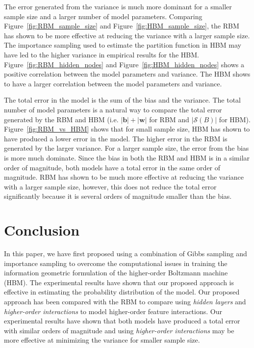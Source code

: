 \documentclass[letterpaper]{article} %
\begin{document}
        The error generated from the variance is much more dominant for a smaller sample size and a larger number of model parameters. Comparing Figure~\ref{fig:RBM_sample_size} and Figure~\ref{fig:HBM_sample_size}, the RBM has shown to be more effective at reducing the variance with a larger sample size. The importance sampling used to estimate the partition function in HBM may have led to the higher variance in empirical results for the HBM.
        Figure~\ref{fig:RBM_hidden_nodes} and Figure~\ref{fig:HBM_hidden_nodes} shows a positive correlation between the model parameters and variance. The HBM shows to have a larger correlation between the model parameters and variance.

        The total error in the model is the sum of the bias and the variance. The total number of model parameters is a natural way to compare the total error generated by the RBM and HBM (i.e. $\left| \mathbf{b} \right| + \left| \mathbf{w} \right|$ for RBM  and $\left| \mathcal{S} \left( B \right) \right|$ for HBM). Figure~\ref{fig:RBM_vs_HBM} shows that for small sample size, HBM has shown to have produced a lower error in the model. The higher error in the RBM is generated by the larger variance. For a larger sample size, the error from the bias is more much dominate. Since the bias in both the RBM and HBM is in a similar order of magnitude, both models have a total error in the same order of magnitude. RBM has shown to be much more effective at reducing the variance with a larger sample size, however, this does not reduce the total error significantly because it is several orders of magnitude smaller than the bias.

\section{Conclusion} \label{sec:conclusion}
	In this paper, we have first proposed using a combination of Gibbs sampling and importance sampling to overcome the computational issues in training the information geometric formulation of the higher-order Boltzmann machine (HBM). The experimental results have shown that our proposed approach is effective in estimating the probability distribution of the model. Our proposed approach has been compared with the RBM to compare using \textit{hidden layers} and \textit{higher-order interactions} to model higher-order feature interactions. Our experimental results have shown that both models have produced a total error with similar orders of magnitude and using \textit{higher-order interactions} may be more effective at minimizing the variance for smaller sample size.
\end{document}
